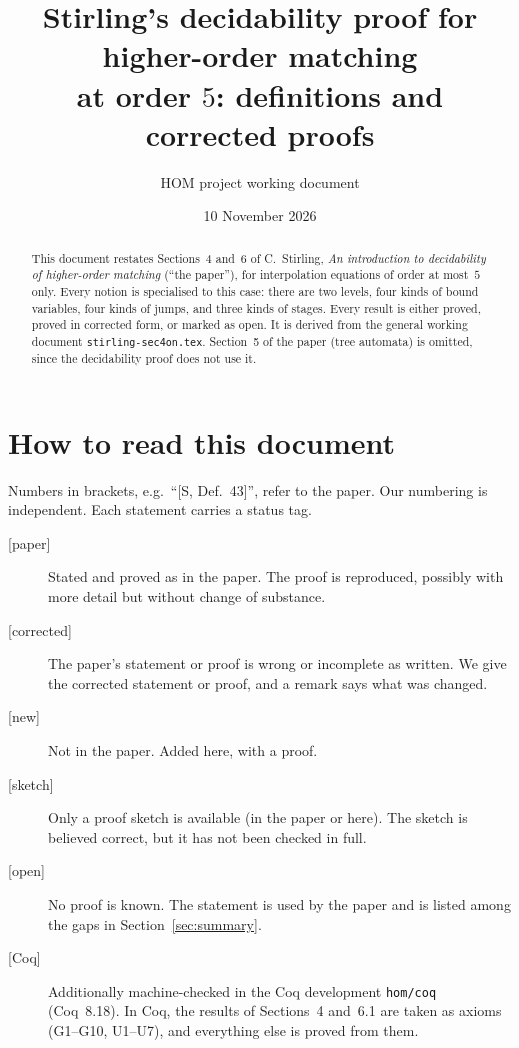 \documentclass[11pt]{article}
\title{Stirling's decidability proof for higher-order matching\\
at order $5$: definitions and corrected proofs}
\author{HOM project working document}
\date{10 November 2026}
\newcommand{\Paper}{\textsf{[paper]}}
\newcommand{\Fixed}{\textsf{[corrected]}}
\newcommand{\New}{\textsf{[new]}}
\newcommand{\Sketch}{\textsf{[sketch]}}
\newcommand{\Open}{\textsf{\color{red!60!black}[open]}}
\newcommand{\Coq}{\textsf{[Coq]}}
\theoremstyle{plain}
\theoremstyle{definition}
\theoremstyle{remark}
\begin{document}
\maketitle

\begin{abstract}
This document restates Sections~4 and~6 of C.~Stirling, \emph{An
introduction to decidability of higher-order matching} (``the paper''),
for interpolation equations of order at most~$5$ only.  Every notion is
specialised to this case: there are two levels, four kinds of bound
variables, four kinds of jumps, and three kinds of stages.  Every result
is either proved, proved in corrected form, or marked as open.  It is
derived from the general working document \texttt{stirling-sec4on.tex}.
Section~5 of the paper (tree automata) is omitted, since the
decidability proof does not use it.
\end{abstract}

\tableofcontents

\section*{How to read this document}

Numbers in brackets, e.g.\ ``[S, Def.~43]'', refer to the paper.  Our
numbering is independent.  Each statement carries a status tag.
\begin{description}
\item[\Paper] Stated and proved as in the paper.  The proof is
  reproduced, possibly with more detail but without change of substance.
\item[\Fixed] The paper's statement or proof is wrong or incomplete as
  written.  We give the corrected statement or proof, and a remark says
  what was changed.
\item[\New] Not in the paper.  Added here, with a proof.
\item[\Sketch] Only a proof sketch is available (in the paper or here).
  The sketch is believed correct, but it has not been checked in full.
\item[\Open] No proof is known.  The statement is used by the paper and
  is listed among the gaps in Section~\ref{sec:summary}.
\item[\Coq] Additionally machine-checked in the Coq development
  \texttt{hom/coq} (Coq~8.18).  In Coq, the results of Sections~4
  and~6.1 are taken as axioms (G1--G10, U1--U7), and everything else is
  proved from them.
\end{description}
\end{document}
